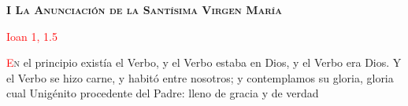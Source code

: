 \begin{center}
    \textbf{\textsc{I La Anunciación de la Santísima Virgen María}}

    \textcolor{red}{Ioan 1, 1.5}
\end{center}

\lettrine[lines=2]{\textcolor{red}{E}}n el principio existía el Verbo, y el Verbo estaba en Dios, y el Verbo era Dios. Y el Verbo se hizo
carne, y habitó entre nosotros; y contemplamos su gloria, gloria cual Unigénito procedente del Padre: lleno de gracia y de verdad